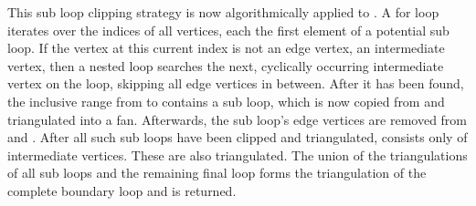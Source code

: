 This sub loop clipping strategy is now algorithmically applied to .
A for loop iterates over the indices of all vertices, each the first element of a potential sub loop.
If the vertex at this current index is not an edge vertex, \ie an intermediate vertex, then a nested loop searches the next, cyclically occurring intermediate vertex on the loop, skipping all edge vertices in between.
After it has been found, the inclusive range from  to  contains a sub loop, which is now copied from  and triangulated into a fan.
Afterwards, the sub loop's edge vertices are removed from  and .
After all such sub loops have been clipped and triangulated,  consists only of intermediate vertices.
These are also triangulated.
The union of the triangulations of all sub loops and the remaining final loop forms the triangulation of the complete boundary loop and is returned.

